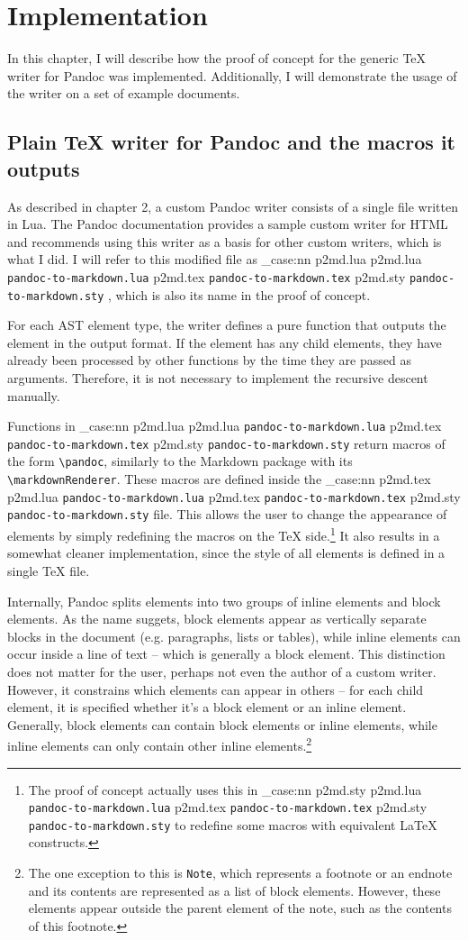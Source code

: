\documentclass[
  digital,     %
  oneside,     %
  nosansbold,  %
  nocolorbold, %
  lof,         %
  nolot,       %
]{fithesis4}
\newcommand\macro[1]{\texttt{\textbackslash{}{#1}}}
\newcommand\pandoc[1]{\macro{pandoc\-{#1}}}
\newcommand\renderer[1]{\macro{markdown\-Renderer\-{#1}}}
\newcommand\file[1]
  {
    \str_case:nn
      { #1 }
      {
        { p2md.lua } { \texttt{pandoc\hyp{}to\hyp{}markdown.lua} }
        { p2md.tex } { \texttt{pandoc\hyp{}to\hyp{}markdown.tex} }
        { p2md.sty } { \texttt{pandoc\hyp{}to\hyp{}markdown.sty} }
      }
  }
\begin{document}
\chapter{Implementation}
In this chapter, I will describe how the proof of concept for the generic \TeX{} writer for Pandoc was implemented. Additionally, I will demonstrate the usage of the writer on a set of example documents.

\section{Plain \TeX{} writer for Pandoc and the macros it outputs}
As described in chapter 2, a custom Pandoc writer consists of a single file written in Lua. The Pandoc documentation provides a sample custom writer for HTML and recommends using this writer as a basis for other custom writers, which is what I did. I will refer to this modified file as \file{p2md.lua}, which is also its name in the proof of concept.

For each AST element type, the writer defines a pure function that outputs the element in the output format. If the element has any child elements, they have already been processed by other functions by the time they are passed as arguments. Therefore, it is not necessary to implement the recursive descent manually.

Functions in \file{p2md.lua} return macros of the form \pandoc{ElementName}, similarly to the Markdown package with its \renderer{ElementName}. These macros are defined inside the \file{p2md.tex} file. This allows the user to change the appearance of elements by simply redefining the macros on the \TeX{} side.\footnote{The proof of concept actually uses this in \file{p2md.sty} to redefine some macros with equivalent \LaTeX{} constructs.} It also results in a somewhat cleaner implementation, since the style of all elements is defined in a single \TeX{} file. 

Internally, Pandoc splits elements into two groups of inline elements and block elements. As the name suggets, block elements appear as vertically separate blocks in the document (e.g. paragraphs, lists or tables), while inline elements can occur inside a line of text -- which is generally a block element. This distinction does not matter for the user, perhaps not even the author of a custom writer. However, it constrains which elements can appear in others -- for each child element, it is specified whether it's a block element or an inline element. Generally, block elements can contain block elements or inline elements, while inline elements can only contain other inline elements.\footnote{The one exception to this is \texttt{Note}, which represents a footnote or an endnote and its contents are represented as a list of block elements. However, these elements appear outside the parent element of the note, such as the contents of this footnote.}
\end{document}
